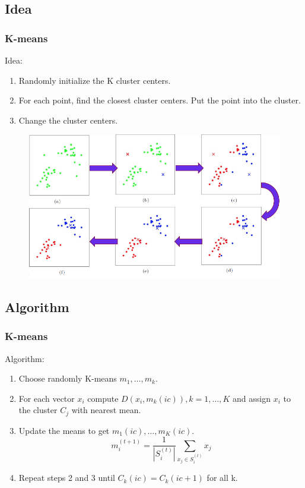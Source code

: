 \documentclass[notheorems,serif,table,compress]{beamer}  %
\begin{document}
\subsection{Idea}
\begin{frame}
\frametitle{K-means}
{\color{blue}Idea:}
    \begin{enumerate}
      \item Randomly initialize the K cluster centers.
      \item For each point, find the closest cluster centers. Put the point into the cluster. 
      \item Change the cluster centers.
    \end{enumerate}
    \begin{figure}
      \includegraphics[width=0.7\linewidth]{kmean1.png} 
    \end{figure}
\end{frame}

\subsection{Algorithm}
\begin{frame}
\frametitle{K-means}
    {\color{blue}Algorithm:}
    \begin{enumerate}
      \item Choose randomly K-means $m_{1},\dots, m_{k}$.
      \item For each vector $x_{i}$ compute $D(x_{i},m_{k}(ic)), k=1,\dots,K$ and assign $x_{i}$ to the cluster $C_{j}$ with nearest mean.
      \item Update the means to get $m_{1}(ic),\dots,m_{K}(ic)$.
          \begin{displaymath}
            m_{i}^{(t+1)}=\frac{1}{|S_{i}^{(t)}|}\sum_{x_{j}\in S_{i}^{(t)}}x_{j}
          \end{displaymath}
      \item Repeat steps 2 and 3 until $C_{k}(ic) = C_{k}(ic+1)$ for all k.
    \end{enumerate}
\end{frame}
\end{document}
